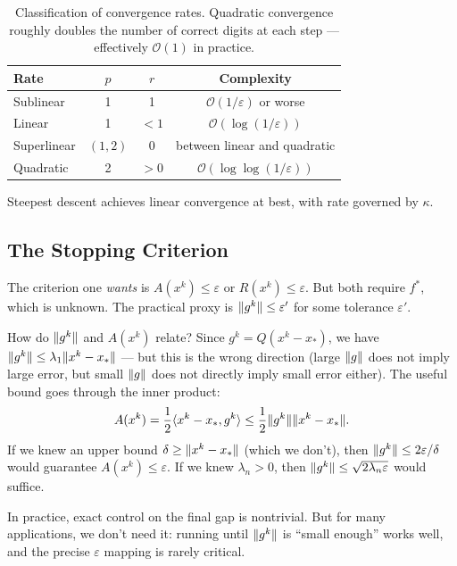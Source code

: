 \begin{table}[ht]
	\centering
	\begin{tabular}{lccc}
		\toprule
		Rate & $p$ & $r$ & Complexity \\
		\midrule
		Sublinear   & 1       & 1   & $\mathcal{O}(1/\varepsilon)$ or worse \\
		Linear      & 1       & $<1$ & $\mathcal{O}(\log(1/\varepsilon))$ \\
		Superlinear & $(1,2)$ & 0   & between linear and quadratic \\
		Quadratic   & 2       & $>0$ & $\mathcal{O}(\log\log(1/\varepsilon))$ \\
		\bottomrule
	\end{tabular}
	\caption{Classification of convergence rates.
		Quadratic convergence roughly doubles the number of correct digits at each step --- effectively $\mathcal{O}(1)$ in practice.}
	\label{tab:conv-rates}
\end{table}

Steepest descent achieves linear convergence at best, with rate governed by $\kappa$.


\subsection{The Stopping Criterion}\label{ssec:stopping}

The criterion one \emph{wants} is $A(x^k) \leq \varepsilon$ or $R(x^k) \leq \varepsilon$.
But both require $f^*$, which is unknown.
The practical proxy is $\lVert g^k\rVert \leq \varepsilon'$ for some tolerance $\varepsilon'$.

How do $\lVert g^k\rVert$ and $A(x^k)$ relate?
Since $g^k = Q(x^k - x_*)$, we have $\lVert g^k\rVert \leq \lambda_1 \lVert x^k - x_*\rVert$ --- but this is the wrong direction (large $\lVert g\rVert$ does not imply large error, but small $\lVert g\rVert$ does not directly imply small error either).
The useful bound goes through the inner product:
\begin{equation}\label{eq:gap-gradient-bound}
	A(x^k) = \frac{1}{2} \langle x^k - x_*, g^k\rangle \leq \frac{1}{2} \lVert g^k\rVert \lVert x^k - x_*\rVert.
\end{equation}
If we knew an upper bound $\delta \geq \lVert x^k - x_*\rVert$ (which we don't), then $\lVert g^k\rVert \leq 2\varepsilon/\delta$ would guarantee $A(x^k) \leq \varepsilon$.
If we knew $\lambda_n > 0$, then $\lVert g^k\rVert \leq \sqrt{2\lambda_n \varepsilon}$ would suffice.

In practice, exact control on the final gap is nontrivial.
But for many applications, we don't need it: running until $\lVert g^k\rVert$ is ``small enough'' works well, and the precise $\varepsilon$ mapping is rarely critical.


